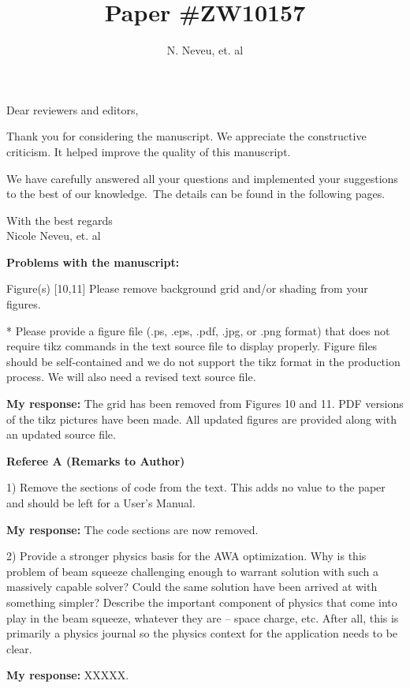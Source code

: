 \documentclass{article}
\begin{document}
\title {Paper  \#ZW10157}
\author {N. Neveu, et. al}

\maketitle
Dear reviewers and editors,

Thank you for considering the manuscript.
We appreciate the constructive criticism. It helped improve the quality of this manuscript.

We have carefully answered all your questions and implemented your suggestions to the best of our knowledge.\ The details can be found in the following pages.

With the best regards  \\[3mm]
 
Nicole Neveu, et. al

\pagebreak

{\bf Problems with the manuscript:}

Figure(s) [10,11]
Please remove background grid and/or shading from your figures.

* Please provide a figure file (.ps, .eps, .pdf, .jpg, or .png format)
that does not require tikz commands in the text source file to
display properly. Figure files should be self-contained and we do
not support the tikz format in the production process. We will also
need a revised text source file.

{\bf My response:} {\color{blue} The grid has been removed from Figures 10 and 11.
PDF versions of the tikz pictures have been made. All updated figures are provided 
along with an updated source file.}


{\bf Referee A (Remarks to Author)}

1) Remove the sections of code from the text. This adds no value to
the paper and should be left for a User’s Manual.

{\bf My response:} {\color{blue} The code sections are now removed.}


2) Provide a stronger physics basis for the AWA optimization. Why is
this problem of beam squeeze challenging enough to warrant solution
with such a massively capable solver? Could the same solution have
been arrived at with something simpler? Describe the important
component of physics that come into play in the beam squeeze, whatever
they are – space charge, etc. After all, this is primarily a physics
journal so the physics context for the application needs to be clear.

{\bf My response:} {\color{blue} XXXXX.}
\end{document}
